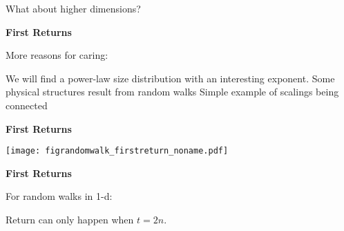     What about higher dimensions?

  


  \textbf{First Returns}

More reasons for caring:

 We will find a power-law size distribution
with an \alert{interesting} exponent.
 Some \alert{physical structures} result from random walks
 Simple example of scalings being \alert{connected}



  \textbf{First Returns}

  \texttt{[image: figrandomwalk\_firstreturn\_noname.pdf]}



  \textbf{First Returns}

  For random walks in 1-d:

  
   
    {Return can only happen when $t=2n$.}
  
